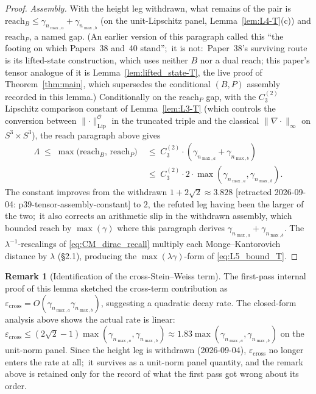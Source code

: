 \documentclass[11pt,a4paper]{article}
\theoremstyle{plain}
\theoremstyle{definition}
\newtheorem{remark}[theorem]{Remark}
\newcommand{\nmaxa}{n_{\max,a}}
\newcommand{\nmaxb}{n_{\max,b}}
\newcommand{\sthree}{S^{3}}
\newcommand{\Op}{\mathcal{O}}
\newcommand{\norm}[1]{\lVert #1 \rVert}
\begin{document}
\begin{proof}
\emph{Assembly.} With the height leg withdrawn, what remains of the pair
is $\mathrm{reach}_B \le \gamma_{\nmaxa} + \gamma_{\nmaxb}$ (on the
unit-Lipschitz panel, Lemma~\ref{lem:L4-T}(c)) and $\mathrm{reach}_P$, a
named gap. (An earlier version of this paragraph called this ``the footing
on which Papers~38 and~40 stand'';\ it is not:\ Paper~38's surviving route
is its lifted-state construction, which uses neither $B$ nor a dual reach;
this paper's tensor analogue of it is Lemma~\ref{lem:lifted_state-T}, the
live proof of Theorem~\ref{thm:main}, which supersedes the conditional
$(B,P)$ assembly recorded in this lemma.) Conditionally on the
$\mathrm{reach}_P$ gap, with the $C_3^{(2)}$
Lipschitz comparison constant of Lemma~\ref{lem:L3-T} (which controls the
conversion between $\norm{\cdot}_{\mathrm{Lip}}^{\Op}$ in the truncated
triple and the classical $\norm{\nabla \cdot}_\infty$ on
$\sthree \times \sthree$), the reach paragraph above gives
\begin{align*}
\Lambda \;\le\; \max\bigl(\mathrm{reach}_B,\, \mathrm{reach}_P\bigr)
&\;\le\; C_3^{(2)} \cdot (\gamma_{\nmaxa} + \gamma_{\nmaxb}) \\
&\;\le\; C_3^{(2)} \cdot 2 \cdot
\max(\gamma_{\nmaxa}, \gamma_{\nmaxb}).
\end{align*}
The constant improves from the withdrawn $1 + 2\sqrt{2} \approx 3.828$
[retracted 2026-09-04: p39-tensor-assembly-constant] to $2$, the refuted leg having been the larger of the two;\ it also corrects
an arithmetic slip in the withdrawn assembly, which bounded
$\mathrm{reach}$ by $\max(\gamma)$ where this paragraph derives
$\gamma_{\nmaxa} + \gamma_{\nmaxb}$.
The $\lambda^{-1}$-rescalings of \eqref{eq:CM_dirac_recall} multiply each
Monge--Kantorovich distance by $\lambda$ (\S2.1), producing the
$\max(\lambda\gamma)$-form of \eqref{eq:L5_bound_T}.
\end{proof}

\begin{remark}[Identification of the cross-Stein--Weiss term]
The first-pass internal proof of this lemma sketched the cross-term
contribution as $\varepsilon_{\mathrm{cross}} = O(\gamma_{\nmaxa}
\gamma_{\nmaxb})$, suggesting a quadratic decay rate. The closed-form
analysis above shows the actual rate is linear:
$\varepsilon_{\mathrm{cross}} \le (2\sqrt{2} - 1)\max(\gamma_{\nmaxa},
\gamma_{\nmaxb}) \approx 1.83\max(\gamma_{\nmaxa}, \gamma_{\nmaxb})$
on the unit-norm panel. Since the height leg is withdrawn (2026-09-04),
$\varepsilon_{\mathrm{cross}}$ no longer enters the rate at all;\ it
survives as a unit-norm panel quantity, and the remark above is retained
only for the record of what the first pass got wrong about its order.
\end{remark}
\end{document}

